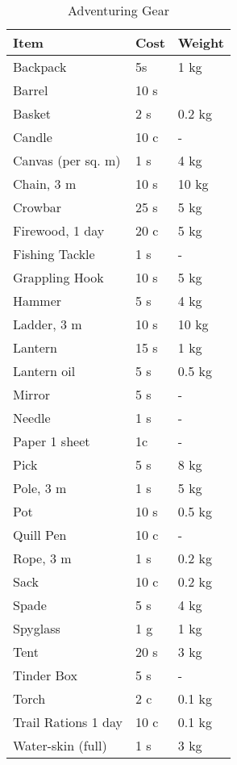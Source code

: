 \begin{table}[ht]
	\centering
	\caption{Adventuring Gear}
	\begin{tabular}{|l|l|l|}
		\hline
		Item & Cost & Weight\\ [0.5ex]
		\hline
		Backpack & 5s & 1 kg\\
		Barrel & 10 s & \\
		Basket & 2 s & 0.2 kg\\
		Candle & 10 c & -\\
		Canvas (per sq. m) & 1 s & 4 kg\\
		Chain, 3 m & 10 s & 10 kg\\
		Crowbar & 25 s & 5 kg\\
		Firewood, 1 day & 20 c & 5 kg\\
		Fishing Tackle & 1 s & -\\
		Grappling Hook & 10 s & 5 kg\\
		Hammer & 5 s & 4 kg\\
		Ladder, 3 m & 10 s & 10 kg\\
		Lantern & 15 s & 1 kg\\
		Lantern oil & 5 s & 0.5 kg \\
		Mirror & 5 s & -\\
		Needle & 1 s & -\\
		Paper 1 sheet & 1c & -\\
		Pick & 5 s & 8 kg\\
		Pole, 3 m & 1 s & 5 kg\\
		Pot & 10 s & 0.5 kg\\
		Quill Pen & 10 c & -\\
		Rope, 3 m & 1 s & 0.2 kg\\
		Sack & 10 c & 0.2 kg\\
		Spade & 5 s & 4 kg\\
		Spyglass & 1 g & 1 kg\\
		Tent & 20 s & 3 kg\\
		Tinder Box & 5 s & -\\
		Torch & 2 c & 0.1 kg\\
		Trail Rations 1 day & 10 c & 0.1 kg\\
		Water-skin (full) & 1 s & 3 kg\\		
		\hline
	\end{tabular}
\end{table}

